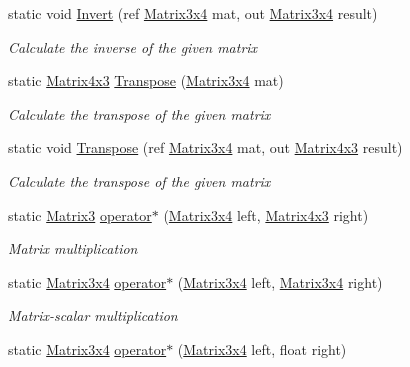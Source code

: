 \begin{DoxyCompactItemize}
static void \hyperlink{struct_open_t_k_1_1_matrix3x4_a5bdc6fa4264eb5562ab81db8fe3f63e1}{Invert} (ref \hyperlink{struct_open_t_k_1_1_matrix3x4}{Matrix3x4} mat, out \hyperlink{struct_open_t_k_1_1_matrix3x4}{Matrix3x4} result)
\begin{DoxyCompactList}\small\item\em Calculate the inverse of the given matrix \end{DoxyCompactList}\item 
static \hyperlink{struct_open_t_k_1_1_matrix4x3}{Matrix4x3} \hyperlink{struct_open_t_k_1_1_matrix3x4_ae53dd7a32e16b68229aef4e4a30e26fa}{Transpose} (\hyperlink{struct_open_t_k_1_1_matrix3x4}{Matrix3x4} mat)
\begin{DoxyCompactList}\small\item\em Calculate the transpose of the given matrix \end{DoxyCompactList}\item 
static void \hyperlink{struct_open_t_k_1_1_matrix3x4_aa934cb41104a5765c27c5614de625fd5}{Transpose} (ref \hyperlink{struct_open_t_k_1_1_matrix3x4}{Matrix3x4} mat, out \hyperlink{struct_open_t_k_1_1_matrix4x3}{Matrix4x3} result)
\begin{DoxyCompactList}\small\item\em Calculate the transpose of the given matrix \end{DoxyCompactList}\item 
static \hyperlink{struct_open_t_k_1_1_matrix3}{Matrix3} \hyperlink{struct_open_t_k_1_1_matrix3x4_a812a5fe7e02551e8cbc557bd4374fc59}{operator$\ast$} (\hyperlink{struct_open_t_k_1_1_matrix3x4}{Matrix3x4} left, \hyperlink{struct_open_t_k_1_1_matrix4x3}{Matrix4x3} right)
\begin{DoxyCompactList}\small\item\em Matrix multiplication \end{DoxyCompactList}\item 
static \hyperlink{struct_open_t_k_1_1_matrix3x4}{Matrix3x4} \hyperlink{struct_open_t_k_1_1_matrix3x4_abfebfb0d957838260c4571d5a3c5dd59}{operator$\ast$} (\hyperlink{struct_open_t_k_1_1_matrix3x4}{Matrix3x4} left, \hyperlink{struct_open_t_k_1_1_matrix3x4}{Matrix3x4} right)
\begin{DoxyCompactList}\small\item\em Matrix-\/scalar multiplication \end{DoxyCompactList}\item 
static \hyperlink{struct_open_t_k_1_1_matrix3x4}{Matrix3x4} \hyperlink{struct_open_t_k_1_1_matrix3x4_ab4e664fca98a65b5df8dfe805d12925a}{operator$\ast$} (\hyperlink{struct_open_t_k_1_1_matrix3x4}{Matrix3x4} left, float right)

\end{DoxyCompactItemize}
